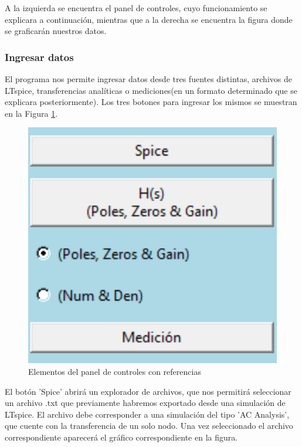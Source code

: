 A la izquierda se encuentra el panel de controles, cuyo funcionamiento se explicara a continuación, mientras que a la derecha se encuentra la figura donde se graficarán nuestros datos.


\subsubsection{Ingresar datos}
El programa nos permite ingresar datos desde tres fuentes distintas, archivos de LTspice, transferencias analíticas o mediciones(en un formato determinado que se explicara posteriormente). Los tres botones para ingresar los mismos se muestran en la Figura \ref{fig:inputControls}.

\begin{figure}[ht]
\centering
\includegraphics[scale=0.3]{resources/inputControls.png}
\caption{Elementos del panel de controles con referencias}
\label{fig:inputControls}
\end{figure}

El botón 'Spice' abrirá un explorador de archivos, que nos permitirá seleccionar un archivo .txt que previamente habremos exportado desde una simulación de LTspice. El archivo debe corresponder a una simulación del tipo 'AC Analysis', que cuente con la transferencia de un solo nodo. Una vez seleccionado el archivo correspondiente aparecerá el gráfico correspondiente en la figura.

